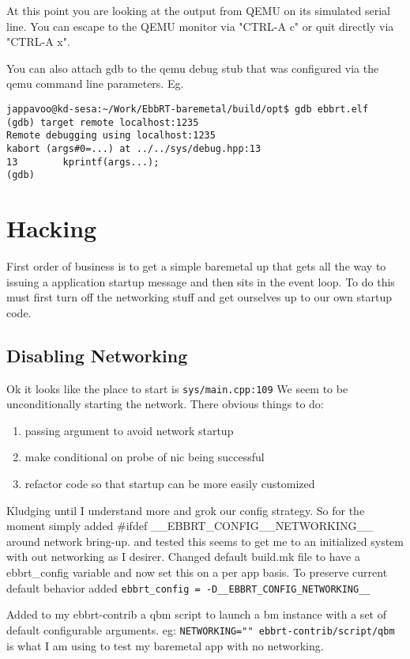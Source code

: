 \documentclass[11pt]{report}
\begin{document}
At this point you are looking at the output from QEMU on its simulated serial line.  You can escape to the QEMU monitor via "CTRL-A c" or quit directly via "CTRL-A x".  

You can also attach gdb to the qemu debug stub that was configured via the qemu command line parameters.
Eg.
\begin{verbatim}
jappavoo@kd-sesa:~/Work/EbbRT-baremetal/build/opt$ gdb ebbrt.elf
(gdb) target remote localhost:1235
Remote debugging using localhost:1235
kabort (args#0=...) at ../../sys/debug.hpp:13
13        kprintf(args...);
(gdb) 
\end{verbatim}

\chapter{Hacking}

First order of business is to get a simple baremetal
up that gets all the way to issuing a application
startup message and then sits in the event loop.
To do this must first turn off the networking stuff
and get ourselves up to our own startup code.

\section{Disabling Networking}

Ok it looks like the place to start is {\tt sys/main.cpp:109}
We seem to be unconditionally starting the network. 
There obvious things to do:
\begin{enumerate}
\item passing argument to avoid network startup
\item make conditional on probe of nic being successful
\item refactor code so that startup can be more easily customized
\end{enumerate}
Kludging until I understand more and grok our config strategy.
So for the moment simply added \#ifdef \_\_EBBRT\_CONFIG\_\_NETWORKING\_\_ around network bring-up.
and tested this seems to get me to an initialized system with out networking
as I desirer.   Changed default build.mk file to have a ebbrt\_config variable and now set this on a per app basis.  To preserve current
default behavior added {\tt ebbrt\_config = -D\_\_EBBRT\_CONFIG\_NETWORKING\_\_}

Added  to my ebbrt-contrib a qbm script to launch a bm instance with
a set of default configurable arguments. eg:
{\tt NETWORKING="" ebbrt-contrib/script/qbm} is what I am using to test 
my baremetal app with no networking.
\end{document}
